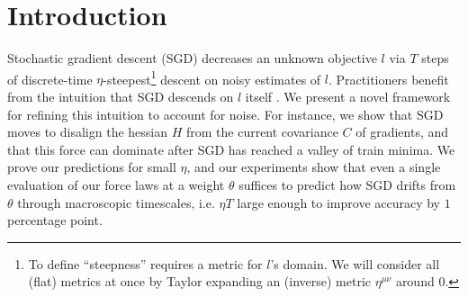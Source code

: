 \documentclass{article}
\theoremstyle{plain}
\newtheorem*{quests*}{Questions}
\theoremstyle{definition}
\begin{document}

\section{Introduction}



    Stochastic gradient descent (SGD) decreases an unknown objective $l$ via
    $T$ steps of discrete-time $\eta$-steepest\footnote{
        To define ``steepness'' requires a metric for $l$'s domain.  We will
        consider all (flat) metrics at once by Taylor expanding an (inverse)
        metric $\eta^{\mu\nu}$ around $0$.
    } descent on noisy estimates of $l$.
    Practitioners benefit from the intuition that SGD descends on $l$ itself
    \cite{bo91}.  We present a novel framework for refining this intuition to
    account for noise.  For instance, we show that SGD moves to disalign the
    hessian $H$ from the current covariance $C$ of gradients, and that this
    force can dominate after SGD has reached a valley of train minima.  We
    prove our predictions for small $\eta$, and our experiments show that even
    a single evaluation of our force laws at a weight $\theta$ suffices to
    predict how SGD drifts from $\theta$ through macroscopic timescales, i.e.
    $\eta T$ large enough to improve accuracy by $1$ percentage point.   
    
  
\end{document}
